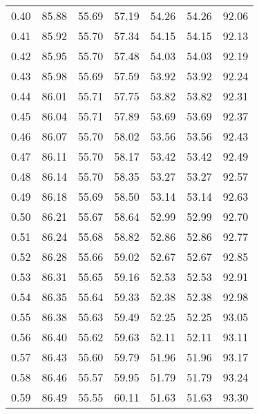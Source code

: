 \begin{tabular}{|c|c|c|c|c|c|c|}
      0.40 &     85.88 &     55.69 &      57.19 &   54.26 &      54.26 &         92.06 \\
      0.41 &     85.92 &     55.70 &      57.34 &   54.15 &      54.15 &         92.13 \\
      0.42 &     85.95 &     55.70 &      57.48 &   54.03 &      54.03 &         92.19 \\
      0.43 &     85.98 &     55.69 &      57.59 &   53.92 &      53.92 &         92.24 \\
      0.44 &     86.01 &     55.71 &      57.75 &   53.82 &      53.82 &         92.31 \\
      0.45 &     86.04 &     55.71 &      57.89 &   53.69 &      53.69 &         92.37 \\
      0.46 &     86.07 &     55.70 &      58.02 &   53.56 &      53.56 &         92.43 \\
      0.47 &     86.11 &     55.70 &      58.17 &   53.42 &      53.42 &         92.49 \\
      0.48 &     86.14 &     55.70 &      58.35 &   53.27 &      53.27 &         92.57 \\
      0.49 &     86.18 &     55.69 &      58.50 &   53.14 &      53.14 &         92.63 \\
      0.50 &     86.21 &     55.67 &      58.64 &   52.99 &      52.99 &         92.70 \\
      0.51 &     86.24 &     55.68 &      58.82 &   52.86 &      52.86 &         92.77 \\
      0.52 &     86.28 &     55.66 &      59.02 &   52.67 &      52.67 &         92.85 \\
      0.53 &     86.31 &     55.65 &      59.16 &   52.53 &      52.53 &         92.91 \\
      0.54 &     86.35 &     55.64 &      59.33 &   52.38 &      52.38 &         92.98 \\
      0.55 &     86.38 &     55.63 &      59.49 &   52.25 &      52.25 &         93.05 \\
      0.56 &     86.40 &     55.62 &      59.63 &   52.11 &      52.11 &         93.11 \\
      0.57 &     86.43 &     55.60 &      59.79 &   51.96 &      51.96 &         93.17 \\
      0.58 &     86.46 &     55.57 &      59.95 &   51.79 &      51.79 &         93.24 \\
      0.59 &     86.49 &     55.55 &      60.11 &   51.63 &      51.63 &         93.30 \\

\end{tabular}
